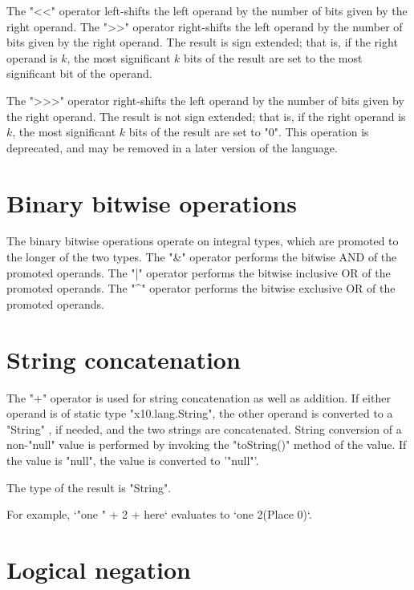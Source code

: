 The \xcd"<<" operator left-shifts the left operand by the number of
bits given by the right operand.
The \xcd">>" operator right-shifts the left operand by the number of
bits given by the right operand.  The result is sign extended;
that is, if the right operand is $k$,
the most significant $k$ bits of the result are set to the most
significant bit of the operand.

The \xcd">>>" operator right-shifts the left operand by the number of
bits given by the right operand.  The result is not sign extended;
that is, if the right operand is $k$,
the most significant $k$ bits of the result are set to \xcd"0".
This operation is deprecated, and may be removed in a later version of the
language. 


\section{Binary bitwise operations}

The binary bitwise operations operate on integral types, which are promoted to
the longer of the two types.
The \xcd"&" operator  performs the bitwise AND of the promoted operands.
The \xcd"|" operator  performs the bitwise inclusive OR of the promoted operands.
The \xcd"^" operator  performs the bitwise exclusive OR of the promoted operands.

\section{String concatenation}

The \xcd"+"  operator is used for string concatenation 
 as well as addition.
If either operand is of static type \xcd"x10.lang.String",
 the other operand is converted to a \xcd"String" , if needed,
  and  the two strings  are concatenated.
 String conversion of a non-\xcd"null" value is  performed by invoking the
 \xcd"toString()" method of the value.
  If the value is \xcd"null", the value is converted to 
  \xcd'"null"'.

The type of the result is \xcd"String".

 For example, 
      \xcd`"one " + 2 + here` 
      evaluates to  \xcd`one 2(Place 0)`.  

\section{Logical negation}

